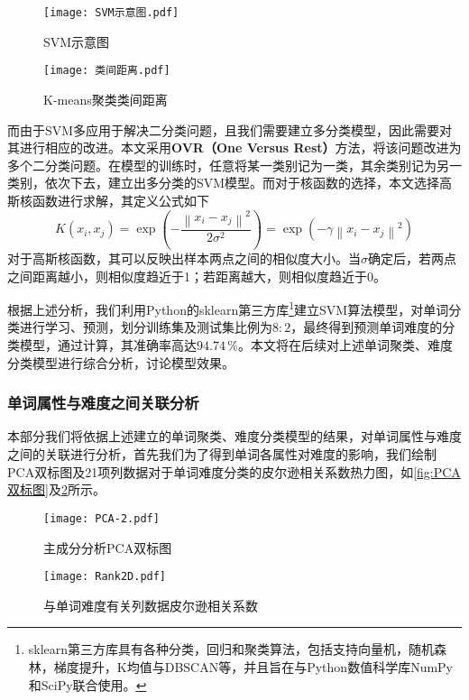 \documentclass{MathModeling}
\begin{document}
	\begin{figure}[H]
		\centering
		\begin{minipage}{0.48\linewidth}
			\centering
			\texttt{[image: SVM示意图.pdf]}
			\caption{SVM示意图}
			\label{fig:svmpicture}
		\end{minipage}
		\begin{minipage}{0.48\linewidth}
			\centering
			\texttt{[image: 类间距离.pdf]}
			\caption{K-means聚类类间距离}
			\label{fig:类间距离}
		\end{minipage}
	\end{figure}

	而由于SVM多应用于解决二分类问题，且我们需要建立多分类模型，因此需要对其进行相应的改进。本文采用\textbf{OVR（One Versus Rest）}方法，将该问题改进为多个二分类问题\textcolor{blue}{\cite{psvm}}。在模型的训练时，任意将某一类别记为一类，其余类别记为另一类别，依次下去，建立出多分类的SVM模型。而对于核函数的选择，本文选择高斯核函数进行求解，其定义公式如下
	\begin{equation}
		K\left(x_i, x_j\right)=\exp \left(-\frac{\left\|x_i-x_j\right\|^{2}}{2\sigma^{2}}\right)=\exp \left(-\gamma \left\|x_i-x_j\right\|^{2}\right) \label{fgauss}
	\end{equation}
	对于高斯核函数，其可以反映出样本两点之间的相似度大小。当$\sigma$确定后，若两点之间距离越小，则相似度趋近于1；若距离越大，则相似度趋近于0。

	根据上述分析，我们利用Python的sklearn第三方库\textcolor{blue}{\footnote{sklearn第三方库具有各种分类，回归和聚类算法，包括支持向量机，随机森林，梯度提升，K均值与DBSCAN等，并且旨在与Python数值科学库NumPy和SciPy联合使用。}}建立SVM算法模型，对单词分类进行学习、预测，划分训练集及测试集比例为$8:2$，最终得到预测单词难度的分类模型，通过计算，其准确率高达$94.74\,\%$。本文将在后续对上述单词聚类、难度分类模型进行综合分析，讨论模型效果。

	\subsubsection{单词属性与难度之间关联分析}
	本部分我们将依据上述建立的单词聚类、难度分类模型的结果，对单词属性与难度之间的关联进行分析，首先我们为了得到单词各属性对难度的影响，我们绘制PCA双标图及21项列数据对于单词难度分类的皮尔逊相关系数热力图，如\textcolor{blue}{\cref{fig:PCA双标图}}及\textcolor{blue}{\cref{fig:21项列数据对单词难度分类皮尔逊相关系数}}所示。

	\begin{figure}[H]
		\centering
		\begin{minipage}{0.48\linewidth}
			\centering
			\texttt{[image: PCA-2.pdf]}
			\caption{主成分分析PCA双标图}
			\label{fig:PCA双标图}
		\end{minipage}
		\begin{minipage}{0.48\linewidth}
			\centering
			\texttt{[image: Rank2D.pdf]}
			\caption{与单词难度有关列数据皮尔逊相关系数}
			\label{fig:21项列数据对单词难度分类皮尔逊相关系数}
		\end{minipage}
	\end{figure}
\end{document}
